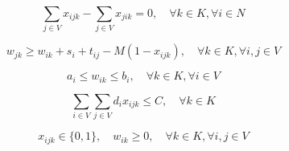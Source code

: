 \documentclass[12pt,titlepage,twoside,openright]{book}
\begin{document}
\begin{equation}
    \sum_{j \in V} x_{ijk} - \sum_{j \in V} x_{jik} = 0, \quad \forall k \in K, \forall i \in N
    \label{eq:VRPTW_flow_balance}
\end{equation}

\begin{equation}
    w_{jk} \geq w_{ik} + s_i + t_{ij} - M (1 - x_{ijk}), \quad \forall k \in K, \forall i,j \in V
    \label{eq:VRPTW_time_window}
\end{equation}

\begin{equation}
    a_i \leq w_{ik} \leq b_i, \quad \forall k \in K, \forall i \in V
    \label{eq:VRPTW_time_bounds}
\end{equation}

\begin{equation}
    \sum_{i \in V} \sum_{j \in V} d_i x_{ijk} \leq C, \quad \forall k \in K
    \label{eq:VRPTW_capacity}
\end{equation}

\begin{equation}
    x_{ijk} \in \{0,1\}, \quad w_{ik} \geq 0, \quad \forall k \in K, \forall i,j \in V
    \label{eq:VRPTW_domains}
\end{equation}
\end{document}
